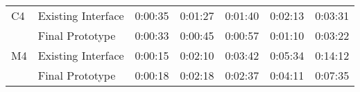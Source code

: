 \begin{table}[tb]
\begin{tabular}{@{}llrrrrr@{}}
  C4       & Existing Interface & 0:00:35                 & 0:01:27                & 0:01:40                    & 0:02:13                & 0:03:31                 \\
           & Final Prototype    & 0:00:33                 & 0:00:45                & 0:00:57                    & 0:01:10                & 0:03:22                 \\ \midrule
  M4       & Existing Interface & 0:00:15                 & 0:02:10                & 0:03:42                    & 0:05:34                & 0:14:12                 \\
           & Final Prototype    & 0:00:18                 & 0:02:18                & 0:02:37                    & 0:04:11                & 0:07:35                 \\ \bottomrule
  \end{tabular}
  \end{table}

